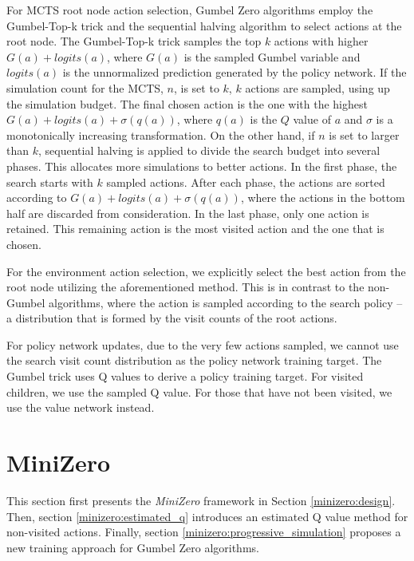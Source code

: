 For MCTS root node action selection, Gumbel Zero algorithms employ the Gumbel-Top-k trick \cite{kool_stochastic_2019} and the sequential halving algorithm \cite{karnin_almost_2013} to select actions at the root node.
The Gumbel-Top-k trick samples the top $k$ actions with higher $G(a)+logits(a)$, where $G(a)$ is the sampled Gumbel variable and $logits(a)$ is the unnormalized prediction generated by the policy network.
If the simulation count for the MCTS, $n$, is set to $k$, $k$ actions are sampled, using up the simulation budget. The final chosen action is the one with the highest $G(a)+logits(a)+\sigma(q(a))$, where $q(a)$ is the $Q$ value of $a$ and $\sigma$ is a monotonically increasing transformation.
On the other hand, if $n$ is set to larger than $k$, sequential halving is applied to divide the search budget into several phases. This allocates more simulations to better actions. 
In the first phase, the search starts with $k$ sampled actions. 
After each phase, the actions are sorted according to $G(a)+logits(a)+\sigma(q(a))$, where the actions in the bottom half are discarded from consideration. 
In the last phase, only one action is retained. This remaining action is the most visited action and the one that is chosen.

For the environment action selection, we explicitly select the best action from the root node utilizing the aforementioned method. 
This is in contrast to the non-Gumbel algorithms, where the action is sampled according to the search policy -- a distribution that is formed by the visit counts of the root actions.

For policy network updates, due to the very few actions sampled, we cannot use the search visit count distribution as the policy network training target.
The Gumbel trick uses Q values to derive a policy training target.
For visited children, we use the sampled Q value.
For those that have not been visited, we use the value network instead.


\section{MiniZero}
This section first presents the \textit{MiniZero} framework in Section \ref{minizero:design}. Then, section \ref{minizero:estimated_q} introduces an estimated Q value method for non-visited actions. Finally, section \ref{minizero:progressive_simulation} proposes a new training approach for Gumbel Zero algorithms.

